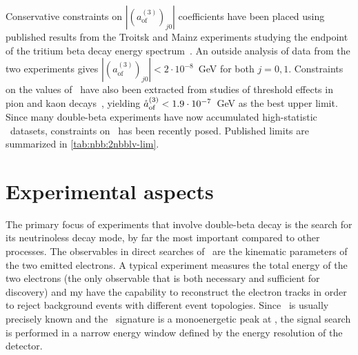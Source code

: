 Conservative constraints on $|{(a_\text{of}^{(3)})}_{j0}|$ coefficients have
been placed using published results from the Troitsk and Mainz experiments
studying the endpoint of the tritium beta decay energy
spectrum~\cite{Diaz2013}. An outside analysis of data from the two experiments
gives $|{(a_\text{of}^{(3)})}_{j0}| < 2 \cdot 10^{-8}$~GeV for both $j=0,1$.
Constraints on the values of \aof\ have also been extracted from studies of
threshold effects in pion and kaon decays~\cite{Kostelecky2011}, yielding
${\mathring{a}_\text{of}^{(3)}} < 1.9 \cdot 10^{-7}$~GeV as the best upper limit.  Since many
double-beta experiments have now accumulated high-statistic \nnbb\ datasets,
constraints on \aof\ has been recently posed. Published limits are summarized
in \cref{tab:nbb:2nbblv-lim}.

\begin{table}
  \centering
  \caption{%
    Compilation of current experimental bounds at 90\% C.L.~on \aof.
  }\label{tab:nbb:2nbblv-lim}
  
\end{table}

\section{Experimental aspects}%
\label{sec:nbb:exp}

The primary focus of experiments that involve double-beta decay is the search
for its neutrinoless decay mode, by far the most important compared to other
processes. The observables in direct searches of \onbb\ are the kinematic
parameters of the two emitted electrons. A typical experiment measures the
total energy of the two electrons (the only observable that is both necessary
and sufficient for discovery) and my have the capability to reconstruct the
electron tracks in order to reject background events with different event
topologies. Since \qbb\ is usually precisely known and the \onbb\ signature is
a monoenergetic peak at \qbb, the signal search is performed in a narrow energy
window defined by the energy resolution of the detector.

